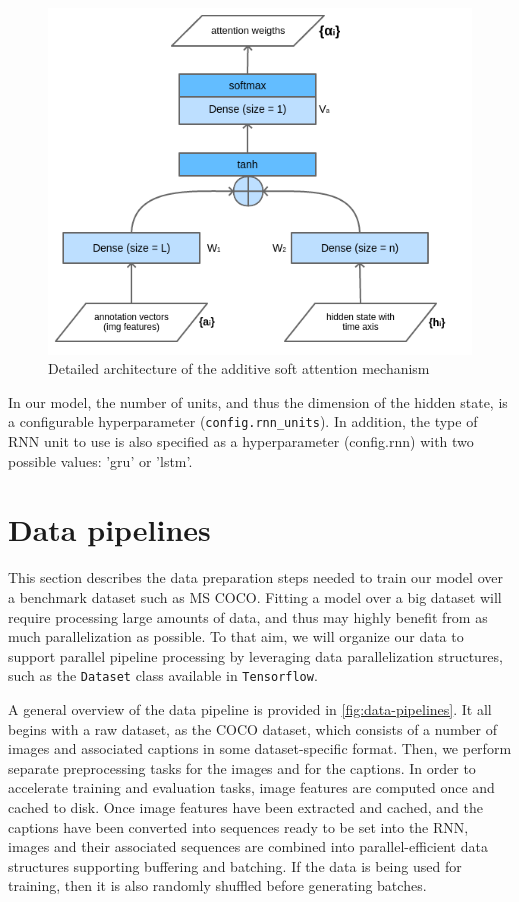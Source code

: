 \begin{figure}[hpt]
    \centering
    \includegraphics[scale=0.6]{images/ch4/attention-architecture.png}
    \caption{Detailed architecture of the additive soft attention mechanism}
    \label{fig:attention-architecture}
\end{figure}

In our model, the number of units, and thus the dimension of the hidden state, is a configurable hyperparameter (\lstinline{config.rnn_units}). In addition, the type of RNN unit to use is also specified as a hyperparameter (config.rnn) with two possible values: 'gru' or 'lstm'.

\section{Data pipelines}

This section describes the data preparation steps needed to train our model over a benchmark dataset such as MS COCO. Fitting a model over a big dataset will require processing large amounts of data, and thus may highly benefit from as much parallelization as possible. To that aim, we will organize our data to support parallel pipeline processing by leveraging data parallelization structures, such as the \lstinline{Dataset} class available in \lstinline{Tensorflow}.

A general overview of the data pipeline is provided in \cref{fig:data-pipelines}. It all begins with a raw dataset, as the COCO dataset, which consists of a number of images and associated captions in some dataset-specific format. Then, we perform separate preprocessing tasks for the images and for the captions. In order to accelerate training and evaluation tasks, image features are computed once and cached to disk. Once image features have been extracted and cached, and the captions have been converted into sequences ready to be set into the RNN, images and their associated sequences are combined into parallel-efficient data structures supporting buffering and batching. If the data is being used for training, then it is also randomly shuffled before generating batches.

